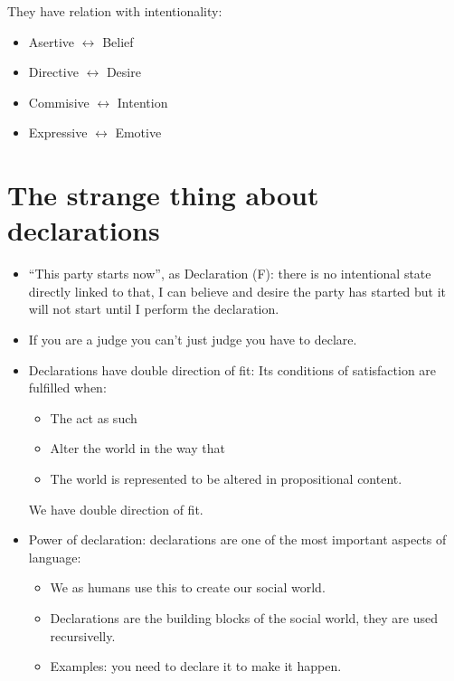 They have relation with intentionality:
\begin{itemize}
    \item Asertive $\leftrightarrow $  Belief 
    \item Directive $\leftrightarrow $  Desire 
    \item Commisive $\leftrightarrow $ Intention
    \item Expressive $\leftrightarrow $ Emotive
\end{itemize}


\section{The strange thing about declarations}
\begin{itemize}
    \item ``This party starts now'', as Declaration (F): there is no intentional state directly linked to that, I can believe and desire the party has started but it will not start until I perform the declaration.
    \item If you are a judge you can't just judge you have to declare.
    \item Declarations have double direction of fit: Its conditions of satisfaction are fulfilled when:
        \begin{itemize}
            \item The act as such 
            \item Alter the world in the way that 
            \item The world is represented to be altered in propositional content.
        \end{itemize}
        We have double direction of fit.
    
    \item Power of declaration: declarations are one of the most important aspects of language:
        \begin{itemize}
            \item We as humans use this to create our social world.
            \item Declarations are the building blocks of the social world, they are used recursivelly.
            \item Examples: you need to declare it to make it happen.
        \end{itemize}
\end{itemize}



